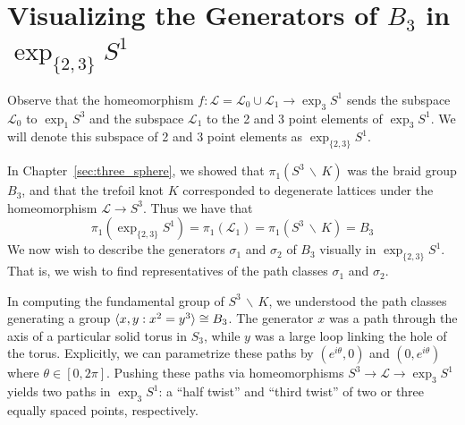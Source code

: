 \documentclass[12pt,twoside]{reedthesis}
\theoremstyle{definition}
\newcommand{\LS}{\mathcal{L}}
\newcommand{\exptwothree}{\exp_{\{2,3\}}}
\newcommand{\wo}{\, \backslash \,}
\DeclarePairedDelimiter\ang{\langle}{\rangle}
\begin{document}
\section{Visualizing the Generators of $B_3$ in $\exptwothree S^1$}

Observe that the homeomorphism $f : \LS = \LS_0 \cup \LS_1 \to \exp_3 S^1$ sends the subspace $\LS_0 $ to $\exp_1 S^3$ and the subspace $\LS_1$ to the 2 and 3 point elements of $\exp_3 S^1$.
We will denote this subspace of 2 and 3 point elements as $\exptwothree S^1$.

In Chapter~\ref{sec:three_sphere}, we showed that $\pi_1(S^3 \wo K)$ was the braid group $B_3$, and that the trefoil knot $K$ corresponded to degenerate lattices under the homeomorphism $\LS \to S^3$.
Thus we have that
\begin{equation*}
  \pi_1(\exptwothree S^1) = \pi_1(\LS_1) = \pi_1(S^3 \wo K) = B_3
\end{equation*}
We now wish to describe the generators $\sigma_1$ and $\sigma_2$ of $B_3$ visually in $\exptwothree S^1$.
That is, we wish to find representatives of the path classes $\sigma_1$ and $\sigma_2$.

In computing the fundamental group of $S^3 \wo K$, we understood the path classes generating a group $\ang{x, y : x^2 = y^3} \cong B_3$.
The generator $x$ was a path through the axis of a particular solid torus in $S_3$, while $y$ was a large loop linking the hole of the torus.
Explicitly, we can parametrize these paths by $(e^{i \theta}, 0)$ and $(0, e^{i \theta})$ where $\theta \in [0, 2 \pi]$.
Pushing these paths via homeomorphisms $S^3 \to \LS \to \exp_3 S^1$ yields two paths in $\exp_3 S^1$: a ``half twist'' and ``third twist'' of two or three equally spaced points, respectively.
\end{document}
